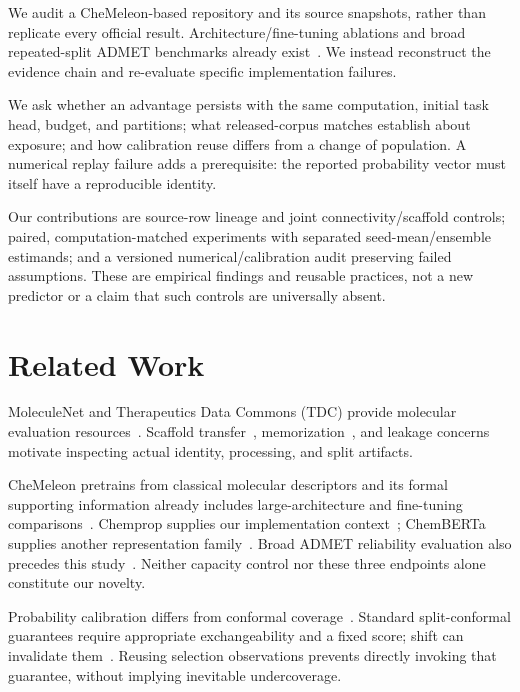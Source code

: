 \documentclass[runningheads,a4paper]{llncs}
\begin{document}
We audit a CheMeleon-based repository and its source snapshots, rather than replicate every official result. Architecture/fine-tuning ablations and broad repeated-split ADMET benchmarks already exist~\cite{burns2025chemeleon,zhao2026revisiting}. We instead reconstruct the evidence chain and re-evaluate specific implementation failures.

We ask whether an advantage persists with the same computation, initial task head, budget, and partitions; what released-corpus matches establish about exposure; and how calibration reuse differs from a change of population. A numerical replay failure adds a prerequisite: the reported probability vector must itself have a reproducible identity.

Our contributions are source-row lineage and joint connectivity/scaffold controls; paired, computation-matched experiments with separated seed-mean/ensemble estimands; and a versioned numerical/calibration audit preserving failed assumptions. These are empirical findings and reusable practices, not a new predictor or a claim that such controls are universally absent.

\section{Related Work}
MoleculeNet and Therapeutics Data Commons (TDC) provide molecular evaluation resources~\cite{wu2018moleculenet,huang2021tdc}. Scaffold transfer~\cite{bemis1996properties}, memorization~\cite{wallach2018most}, and leakage concerns~\cite{kapoor2023leakage} motivate inspecting actual identity, processing, and split artifacts.

CheMeleon pretrains from classical molecular descriptors and its formal supporting information already includes large-architecture and fine-tuning comparisons~\cite{burns2025chemeleon}. Chemprop supplies our implementation context~\cite{yang2019analyzing,heid2024chemprop}; ChemBERTa supplies another representation family~\cite{chithrananda2020chemberta}. Broad ADMET reliability evaluation also precedes this study~\cite{zhao2026revisiting}. Neither capacity control nor these three endpoints alone constitute our novelty.

Probability calibration differs from conformal coverage~\cite{guo2017calibration,vovk2005algorithmic,angelopoulos2021gentle}. Standard split-conformal guarantees require appropriate exchangeability and a fixed score; shift can invalidate them~\cite{barber2023conformal}. Reusing selection observations prevents directly invoking that guarantee, without implying inevitable undercoverage.
\end{document}
